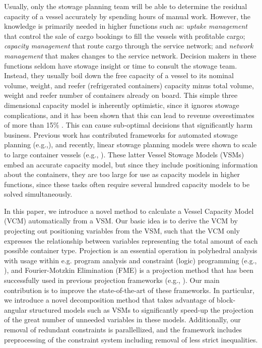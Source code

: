 \documentclass{llncs}
\begin{document}
Usually, only the stowage planning team will be able to determine the residual capacity of a vessel accurately by spending hours of manual work. 
However, the knowledge is primarily needed in higher functions such as: {\em uptake management} that control the sale of cargo bookings to fill the vessels with profitable cargo; {\em capacity management} that route cargo through the service network; and {\em network management} that makes changes to the service network. Decision makers in these functions seldom have stowage insight or time to consult the stowage team. Instead, they usually boil down the free capacity of a vessel to its nominal volume, weight, and reefer (refrigerated containers) capacity minus total volume, weight and reefer number of containers already on board. This simple three dimensional capacity model is inherently optimistic, since it ignores stowage complications, and it has been shown that this can lead to revenue overestimates of more than 15\% \cite{AlbertosThesis}. This can cause sub-optimal decisions that significantly harm business. 
Previous work has contributed frameworks for automated stowage planning (e.g.,\cite{roach00,kimkang02,ambrosino04,pacino11}), and recently, linear stowage planning models were shown to scale to large container vessels (e.g., \cite{AlbertosThesis}). These latter Vessel Stowage Models (VSMs) embed an accurate capacity model, but since they include positioning information about the containers, they are too large for use as capacity models in higher functions, since these tasks often require several hundred capacity models to be solved simultaneously.

In this paper, we introduce a novel method to calculate a Vessel Capacity Model (VCM) automatically from a VSM. Our basic idea is to derive the VCM by projecting out positioning variables from the VSM, such that the VCM only expresses the relationship between variables representing the total amount of each possible container type. 
Projection is an essential operation in polyhedral analysis with usage within e.g. program analysis and constraint (logic) programming (e.g., \cite{fordan98,lassez90,benoy05}), and Fourier-Motzkin Elimination (FME) is a projection method that has been successfully used in previous projection frameworks (e.g., \cite{simon05,lukatskii08,shapot12}). Our main contribution is to improve the state-of-the-art of these frameworks.
In particular, we introduce a novel decomposition method that takes advantage of block-angular structured models such as VSMs to significantly speed-up the projection of the great number of unneeded variables in these models. Additionally, our removal of redundant constraints is parallellized, and the framework includes preprocessing of the constraint system including removal of less strict inequalities.
\end{document}
